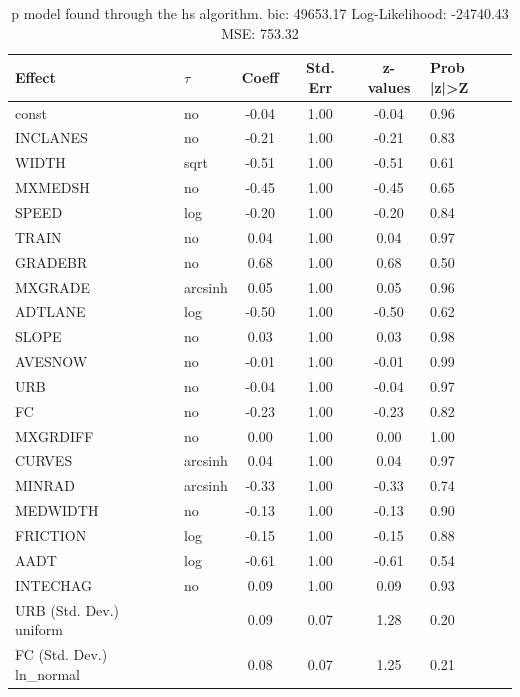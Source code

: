 \begin{table}
	\caption{p model found through the hs algorithm. bic: 49653.17 Log-Likelihood: -24740.43 MSE: 753.32}
	\begin{center}
		\begin{tabular}{|l|l|c|c|c|l|}
			\hline
			Effect & $\tau$ & Coeff & Std. Err & z-values & Prob |z|>Z \\
			\hline
			const & no & -0.04 & 1.00 & -0.04 & 0.96 \\
			\hline
			INCLANES & no & -0.21 & 1.00 & -0.21 & 0.83 \\
			\hline
			WIDTH & sqrt & -0.51 & 1.00 & -0.51 & 0.61 \\
			\hline
			MXMEDSH & no & -0.45 & 1.00 & -0.45 & 0.65 \\
			\hline
			SPEED & log & -0.20 & 1.00 & -0.20 & 0.84 \\
			\hline
			TRAIN & no & 0.04 & 1.00 & 0.04 & 0.97 \\
			\hline
			GRADEBR & no & 0.68 & 1.00 & 0.68 & 0.50 \\
			\hline
			MXGRADE & arcsinh & 0.05 & 1.00 & 0.05 & 0.96 \\
			\hline
			ADTLANE & log & -0.50 & 1.00 & -0.50 & 0.62 \\
			\hline
			SLOPE & no & 0.03 & 1.00 & 0.03 & 0.98 \\
			\hline
			AVESNOW & no & -0.01 & 1.00 & -0.01 & 0.99 \\
			\hline
			URB & no & -0.04 & 1.00 & -0.04 & 0.97 \\
			\hline
			FC & no & -0.23 & 1.00 & -0.23 & 0.82 \\
			\hline
			MXGRDIFF & no & 0.00 & 1.00 & 0.00 & 1.00 \\
			\hline
			CURVES & arcsinh & 0.04 & 1.00 & 0.04 & 0.97 \\
			\hline
			MINRAD & arcsinh & -0.33 & 1.00 & -0.33 & 0.74 \\
			\hline
			MEDWIDTH & no & -0.13 & 1.00 & -0.13 & 0.90 \\
			\hline
			FRICTION & log & -0.15 & 1.00 & -0.15 & 0.88 \\
			\hline
			AADT & log & -0.61 & 1.00 & -0.61 & 0.54 \\
			\hline
			INTECHAG & no & 0.09 & 1.00 & 0.09 & 0.93 \\
			\hline
			URB (Std. Dev.) uniform &  & 0.09 & 0.07 & 1.28 & 0.20 \\
			\hline
			FC (Std. Dev.) ln_normal &  & 0.08 & 0.07 & 1.25 & 0.21 \\
			\hline

\end{tabular}
\end{center}
\end{table}
